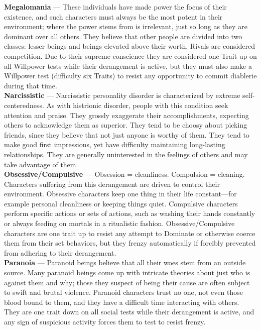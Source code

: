 \textbf{Megalomania} --- These individuals have made power the focus of their existence, and such characters must always be the most potent in their environment; where the power stems from is irrelevant, just so long as they are dominant over all others.  They believe that other people are divided into two classes: lesser beings and beings elevated above their worth.  Rivals are considered competition.  Due to their supreme conscience they are considered one Trait up on all Willpower tests while their derangement is active, but they must also make a Willpower test (difficulty six Traits) to resist any opportunity to commit diablerie during that time. \\

\textbf{Narcissistic} --- Narcissistic personality disorder is characterized by extreme self-centeredness.  As with histrionic disorder, people with this condition seek attention and praise.  They grossly exaggerate their accomplishments, expecting others to acknowledge them as superior.  They tend to be choosy about picking friends, since they believe that not just anyone is worthy of them.  They tend to make good first impressions, yet have difficulty maintaining long-lasting relationships.  They are generally uninterested in the feelings of others and may take advantage of them. \\

\textbf{Obsessive/Compulsive} --- Obsession = cleanliness.  Compulsion = cleaning.  Characters suffering from this derangement are driven to control their environment.  Obsessive characters keep one thing in their life constant---for example personal cleanliness or keeping things quiet.  Compulsive characters perform specific actions or sets of actions, such as washing their hands constantly or always feeding on mortals in a ritualistic fashion.  Obsessive/Compulsive characters are one trait up to resist any attempt to Dominate or otherwise coerce them from their set behaviors, but they frenzy automatically if forcibly prevented from adhering to their derangement. \\

\textbf{Paranoia} --- Paranoid beings believe that all their woes stem from an outside source.  Many paranoid beings come up with intricate theories about just who is against them and why; those they suspect of being their cause are often subject to swift and brutal violence.  Paranoid characters trust no one, not even those blood bound to them, and they have a difficult time interacting with others.  They are one trait down on all social tests while their derangement is active, and any sign of suspicious activity forces them to test to resist frenzy. \\

